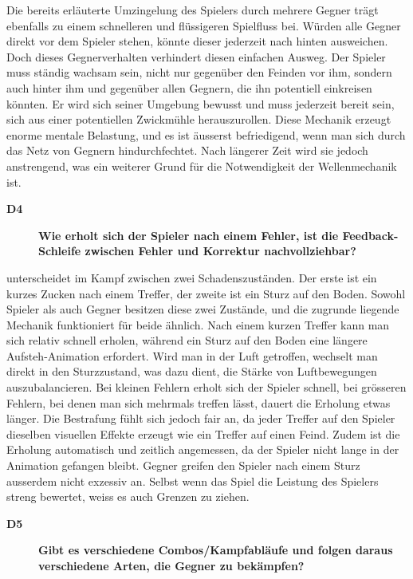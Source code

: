 \documentclass[../Main.tex]{subfiles}
\begin{document}
Die bereits erläuterte Umzingelung des Spielers durch mehrere Gegner trägt ebenfalls zu einem schnelleren und flüssigeren Spielfluss bei. Würden alle Gegner direkt vor dem Spieler stehen, könnte dieser jederzeit nach hinten ausweichen. Doch dieses Gegnerverhalten verhindert diesen einfachen Ausweg. Der Spieler muss ständig wachsam sein, nicht nur gegenüber den Feinden vor ihm, sondern auch hinter ihm und gegenüber allen Gegnern, die ihn potentiell einkreisen könnten. Er wird sich seiner Umgebung bewusst und muss jederzeit bereit sein, sich aus einer potentiellen Zwickmühle herauszurollen. Diese Mechanik erzeugt enorme mentale Belastung, und es ist äusserst befriedigend, wenn man sich durch das Netz von Gegnern hindurchfechtet. Nach längerer Zeit wird sie jedoch anstrengend, was ein weiterer Grund für die Notwendigkeit der Wellenmechanik ist.

\begin{description}
  \item[\textbf{D4}] \textbf{Wie erholt sich der Spieler nach einem Fehler, ist die Feedback-Schleife zwischen Fehler und Korrektur nachvollziehbar?}
\end{description}

 unterscheidet im Kampf zwischen zwei Schadenszuständen. Der erste ist ein kurzes Zucken nach einem Treffer, der zweite ist ein Sturz auf den Boden. Sowohl Spieler als auch Gegner besitzen diese zwei Zustände, und die zugrunde liegende Mechanik funktioniert für beide ähnlich. Nach einem kurzen Treffer kann man sich relativ schnell erholen, während ein Sturz auf den Boden eine längere Aufsteh-Animation erfordert. Wird man in der Luft getroffen, wechselt man direkt in den Sturzzustand, was dazu dient, die Stärke von Luftbewegungen auszubalancieren. Bei kleinen Fehlern erholt sich der Spieler schnell, bei grösseren Fehlern, bei denen man sich mehrmals treffen lässt, dauert die Erholung etwas länger. Die Bestrafung fühlt sich jedoch fair an, da jeder Treffer auf den Spieler dieselben visuellen Effekte erzeugt wie ein Treffer auf einen Feind. Zudem ist die Erholung automatisch und zeitlich angemessen, da der Spieler nicht lange in der Animation gefangen bleibt. Gegner greifen den Spieler nach einem Sturz ausserdem nicht exzessiv an. Selbst wenn das Spiel die Leistung des Spielers streng bewertet, weiss es auch Grenzen zu ziehen.

\begin{description}
  \item[\textbf{D5}] \textbf{Gibt es verschiedene Combos/Kampfabläufe und folgen daraus verschiedene Arten, die Gegner zu bekämpfen?}
\end{description}
\end{document}
